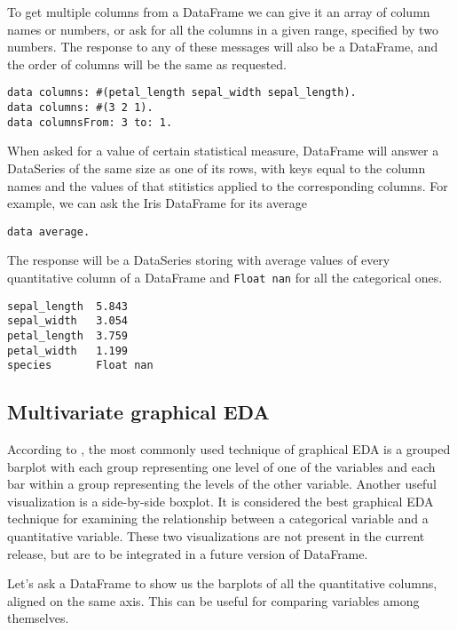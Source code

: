 \documentclass[sigplan]{acmart}
\begin{document}
To get multiple columns from a DataFrame we can give it an array of column names or numbers, or ask for all the columns in a given range, specified by two numbers. The response to any of these messages will also be a DataFrame, and the order of columns will be the same as requested.

\begin{lstlisting}[basicstyle=\small,language=Smalltalk]
data columns: #(petal_length sepal_width sepal_length).
data columns: #(3 2 1).
data columnsFrom: 3 to: 1.
\end{lstlisting}

When asked for a value of certain statistical measure, DataFrame will answer a DataSeries of the same size as one of its rows, with keys equal to the column names and the values of that stitistics applied to the corresponding columns. For example, we can ask the Iris DataFrame for its average

\begin{lstlisting}[basicstyle=\small,language=Smalltalk]
data average.
\end{lstlisting}

The response will be a DataSeries storing with average values of every quantitative column of a DataFrame and \texttt{Float nan} for all the categorical ones.

\begin{lstlisting}[basicstyle=\small,language=Smalltalk]
sepal_length  5.843
sepal_width   3.054
petal_length  3.759
petal_width   1.199
species       Float nan
\end{lstlisting}

\subsection{Multivariate graphical EDA}
\label{sec:multi-graph}

According to \cite{Seltman}, the most commonly used technique of graphical EDA is a grouped barplot with each group representing one level of one of the variables and each bar within a group representing the levels of the other variable. Another useful visualization is a side-by-side boxplot. It is considered the best graphical EDA technique for examining the relationship between a categorical variable and a quantitative variable. These two visualizations are not present in the current release, but are to be integrated in a future version of DataFrame.

Let's ask a DataFrame to show us the barplots of all the quantitative columns, aligned on the same axis. This can be useful for comparing variables among themselves.
\end{document}
